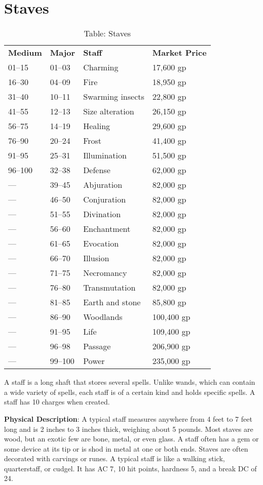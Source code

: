 \section{Staves}

\label{f0}
\begin{table}[]
\sffamily
\caption{Table: Staves}
\begin{tabular}{llll}
\textbf{Medium} & \textbf{Major} & \textbf{Staff} & \textbf{Market Price}\\
01–15 & 01–03 & Charming & 17,600 gp \\
 16–30 & 04–09 & Fire & 18,950 gp \\
 31–40 & 10–11 & Swarming insects & 22,800 gp \\
 41–55 & 12–13 & Size alteration & 26,150 gp \\
 56–75 & 14–19 & Healing & 29,600 gp \\
 76–90 & 20–24 & Frost & 41,400 gp \\
 91–95 & 25–31 & Illumination & 51,500 gp \\
 96–100 & 32–38 & Defense & 62,000 gp \\
 — & 39–45 & Abjuration & 82,000 gp \\
 — & 46–50 & Conjuration & 82,000 gp \\
 — & 51–55 & Divination & 82,000 gp \\
 — & 56–60 & Enchantment & 82,000 gp \\
 — & 61–65 & Evocation & 82,000 gp \\
 — & 66–70 & Illusion & 82,000 gp \\
 — & 71–75 & Necromancy & 82,000 gp \\
 — & 76–80 & Transmutation & 82,000 gp \\
 — & 81–85 & Earth and stone & 85,800 gp \\
 — & 86–90 & Woodlands & 100,400 gp \\
 — & 91–95 & Life & 109,400 gp \\
 — & 96–98 & Passage & 206,900 gp \\
 — & 99–100 & Power & 235,000 gp\\
\end{tabular}
\end{table}
				
A staff is a long shaft that stores several spells. Unlike wands, which can contain a wide variety of spells, each staff is of a certain kind and holds specific spells. A staff has 10 charges when created.
				
\textbf{Physical Description}: A typical staff measures anywhere from 4 feet to 7 feet long and is 2 inches to 3 inches thick, weighing about 5 pounds. Most staves are wood, but an exotic few are bone, metal, or even glass. A staff often has a gem or some device at its tip or is shod in metal at one or both ends. Staves are often decorated with carvings or runes. A typical staff is like a walking stick, quarterstaff, or cudgel. It has AC 7, 10 hit points, hardness 5, and a break DC of 24.
				
